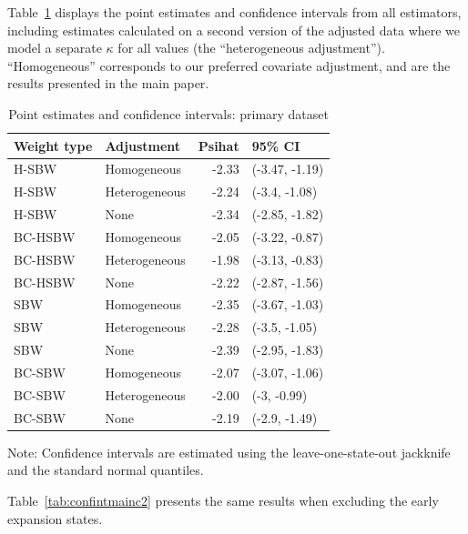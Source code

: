 Table~\ref{tab:confintmain} displays the point estimates and confidence intervals from all estimators, including estimates calculated on a second version of the adjusted data where we model a separate $\kappa$ for all values (the ``heterogeneous adjustment''). ``Homogeneous'' corresponds to our preferred covariate adjustment, and are the results presented in the main paper.

\begin{table}[h!]
\centering
\begin{threeparttable}
\caption{Point estimates and confidence intervals: primary dataset}
\label{tab:confintmain}
\begin{tabular}{llrl}
  \hline
Weight type & Adjustment & Psihat & 95\% CI \\ 
  \hline
H-SBW & Homogeneous & -2.33 & (-3.47, -1.19) \\ 
  H-SBW & Heterogeneous & -2.24 & (-3.4, -1.08) \\ 
  H-SBW & None & -2.34 & (-2.85, -1.82) \\ 
  BC-HSBW & Homogeneous & -2.05 & (-3.22, -0.87) \\ 
  BC-HSBW & Heterogeneous & -1.98 & (-3.13, -0.83) \\ 
  BC-HSBW & None & -2.22 & (-2.87, -1.56) \\ 
  SBW & Homogeneous & -2.35 & (-3.67, -1.03) \\ 
  SBW & Heterogeneous & -2.28 & (-3.5, -1.05) \\ 
  SBW & None & -2.39 & (-2.95, -1.83) \\ 
  BC-SBW & Homogeneous & -2.07 & (-3.07, -1.06) \\ 
  BC-SBW & Heterogeneous & -2.00 & (-3, -0.99) \\ 
  BC-SBW & None & -2.19 & (-2.9, -1.49) \\ 
   \hline
\end{tabular}
    \begin{tablenotes}
      \item[] Note: Confidence intervals are estimated using the leave-one-state-out jackknife and the standard normal quantiles.
    \end{tablenotes}
\end{threeparttable}
\end{table}

Table~\ref{tab:confintmainc2} presents the same results when excluding the early expansion states.

